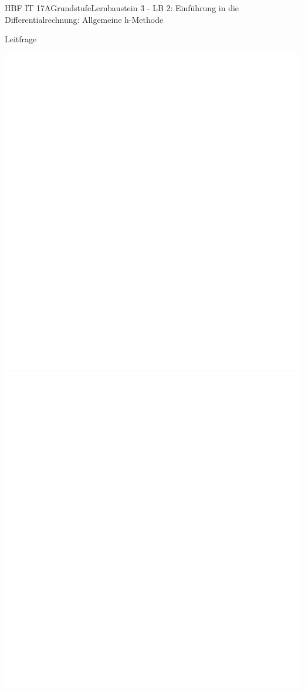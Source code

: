 \documentclass[oneside,openany,headings=optiontotoc,11pt,numbers=noenddot]{scrreprt}
\begin{document}
\begin{worksheet}{HBF IT 17A}{Grundstufe}{Lernbaustein 3 - LB 2: Einführung in die Differentialrechnung: Allgemeine h-Methode}
		\begin{framed}
			\noindent
			\tiny{\color{codegray}Leitfrage}\\
		\end{framed}
		
		\begin{framed}
			\includegraphics[scale=0.75]{../empty.jpg}\\
			\includegraphics[scale=1.1]{../empty.jpg}
		\end{framed}
	

\end{worksheet}
\end{document}
